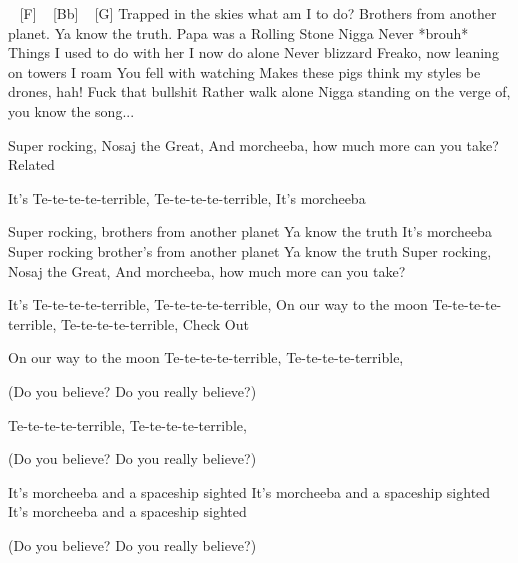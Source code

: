 
\begin{guitar}
[D-] ~ [F] ~ [Bb] ~ [G]
Trapped in the skies what am I to do?
Brothers from another planet. Ya know the truth.
Papa was a Rolling Stone
Nigga Never *brouh*
Things I used to do with her I now do alone
Never blizzard
Freako, now leaning on towers I roam
You fell with watching
Makes these pigs think my styles be drones, hah!
Fuck that bullshit
Rather walk alone
Nigga standing on the verge of, you know the song...

Super rocking, Nosaj the Great,
And morcheeba, how much more can you take?
Related

It's
Te-te-te-te-terrible,
Te-te-te-te-terrible,
It's morcheeba

Super rocking, brothers from another planet
Ya know the truth
It's morcheeba
Super rocking brother's from another planet
Ya know the truth
Super rocking, Nosaj the Great,
And morcheeba, how much more can you take?

It's
Te-te-te-te-terrible,
Te-te-te-te-terrible,
On our way to the moon
Te-te-te-te-terrible,
Te-te-te-te-terrible,
Check Out

On our way to the moon
Te-te-te-te-terrible,
Te-te-te-te-terrible,

(Do you believe? Do you really believe?)

Te-te-te-te-terrible,
Te-te-te-te-terrible,

(Do you believe? Do you really believe?)

It's morcheeba and a spaceship sighted
It's morcheeba and a spaceship sighted
It's morcheeba and a spaceship sighted

(Do you believe? Do you really believe?)
\end{guitar}